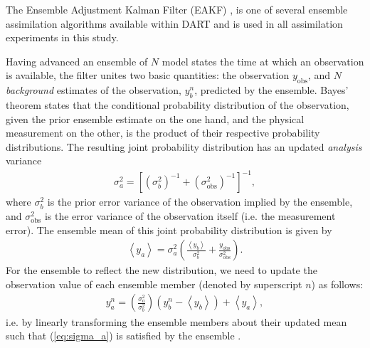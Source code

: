 The Ensemble Adjustment Kalman Filter (EAKF) \citep{anderson2001}, is one of several ensemble assimilation algorithms available within DART and is used in all assimilation experiments in this study. 

Having advanced an ensemble of $N$ model states the time at which an observation is available, 
the filter unites two basic quantities: the observation $y_{\text{obs}}$, and $N$ \textit{background} estimates of the observation, $y_{b}^{n}$, predicted by the ensemble. 
Bayes' theorem states that the conditional probability distribution of the observation, given the prior ensemble estimate on the one hand, and the physical measurement on the other, is the product of their respective probability distributions.
The resulting joint probability distribution has an updated \textit{analysis} variance 
\begin{eqnarray}
 \sigma_a^2 = 
\left[
\left( \sigma_b^2  \right)^{-1}+
\left( \sigma_{\text{obs}}^2  \right)^{-1}
\right]^{-1},
\label{eq:sigma_a}
\end{eqnarray}
where $\sigma_b^2$ is  the prior error variance of the observation implied by the ensemble, and $\sigma_{\text{obs}}^2$ is the error variance of the observation itself (i.e. the measurement error).
The ensemble mean of this joint probability distribution is given by
\begin{eqnarray}
\left< y_a \right> = \sigma_a^2 
\left(
\frac{\left< y_b \right>}{\sigma_b^2} +
\frac{y_{\text{obs}} }{\sigma_{\text{obs}}^2} 
\right).
\label{eq:y_a}
\end{eqnarray}
For the ensemble to reflect the new distribution, we need to update the observation value of each ensemble member (denoted by superscript $n$) as follows:
\begin{eqnarray}
 y_{a}^n = 
\left( \frac{\sigma_a^2}{\sigma_b^2}  \right)
\left(
y_{b}^n - \left< y_b  \right> \right)
+ \left< y_a \right>,
\end{eqnarray}
i.e. by linearly transforming the ensemble members about their updated mean such that (\ref{eq:sigma_a}) is satisfied by the ensemble \citep{andersoncollins2006}.

